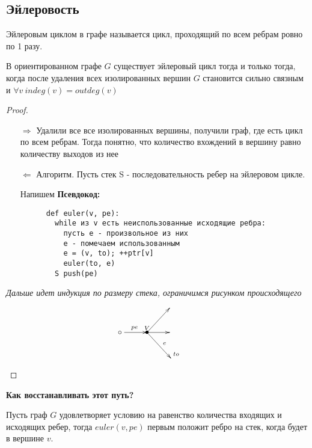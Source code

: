 \subsection{Эйлеровость}
\begin{definition}
  Эйлеровым циклом в графе называется цикл, проходящий по всем ребрам ровно по 1 разу. 
\end{definition}

\begin{theorem}
  В ориентированном графе $G$ существует эйлеровый цикл тогда и только тогда, когда после удаления всех изолированных вершин $G$ становится сильно связным и $\forall v \ indeg(v) = outdeg(v)$ 
\end{theorem}

\begin{proof}
  \begin{enumerate}
    \item[$\Rightarrow$] Удалили все все изолированных вершины, получили граф, где есть цикл по всем ребрам. Тогда понятно, что количество вхождений в вершину равно количеству выходов из нее
    \item[$\Leftarrow$] Алгоритм. Пусть стек S - последовательность ребер на эйлеровом цикле. 
    \text{}
    
    Напишем \textbf{Псевдокод:}

    \begin{verbatim}
      def euler(v, pe):
        while из v есть неиспользованные исходящие ребра:
          пусть e - произвольное из них
          e - помечаем использованным
          e = (v, to); ++ptr[v]
          euler(to, e)
        S push(pe)
    \end{verbatim}
  \end{enumerate}
  \textit{Дальше идет индукция по размеру стека, ограничимся рисунком происходящего}
  $$\xymatrix{
  & & & \\
  {\circ}\ar[r]^>>>>>>{pe} ^>{V} & *=0{\bullet}\ar[ur] \ar[r] \ar[dr]^>>>>>>>{e} ^>{to} &\\
  & & &\\
  }$$
 
\end{proof}

\textbf{Как восстанавливать этот путь?}

\begin{lemma}
  Пусть граф $G$ удовлетворяет условию на равенство количества входящих и исходящих ребер, тогда $euler(v, pe)$ первым положит ребро на стек, когда будет в вершине $v$. 
\end{lemma}

